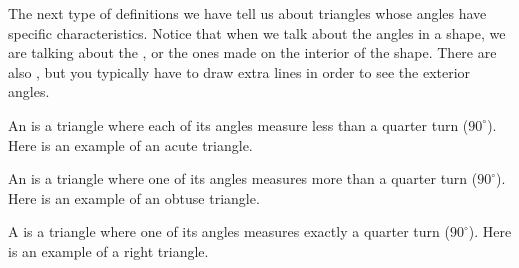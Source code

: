 \documentclass{ximera}
\begin{document}
The next type of definitions we have tell us about triangles whose angles have specific characteristics. Notice that when we talk about the angles in a shape, we are talking about the , or the ones made on the interior of the shape. There are also , but you typically have to draw extra lines in order to see the exterior angles.

\begin{definition}
	An  is a triangle where each of its angles measure less than a quarter turn ($90^{\circ}$). Here is an example of an acute triangle.
	\begin{center}
	\end{center}
\end{definition}


\begin{definition}
	An  is a triangle where one of its angles measures more than a quarter turn ($90^{\circ}$). Here is an example of an obtuse triangle.
	\begin{center}
	\end{center}
\end{definition}

\begin{definition}
	A  is a triangle where one of its angles measures exactly a quarter turn ($90^{\circ}$). Here is an example of a right triangle.
	\begin{center}
	\end{center}
\end{definition}
\end{document}
